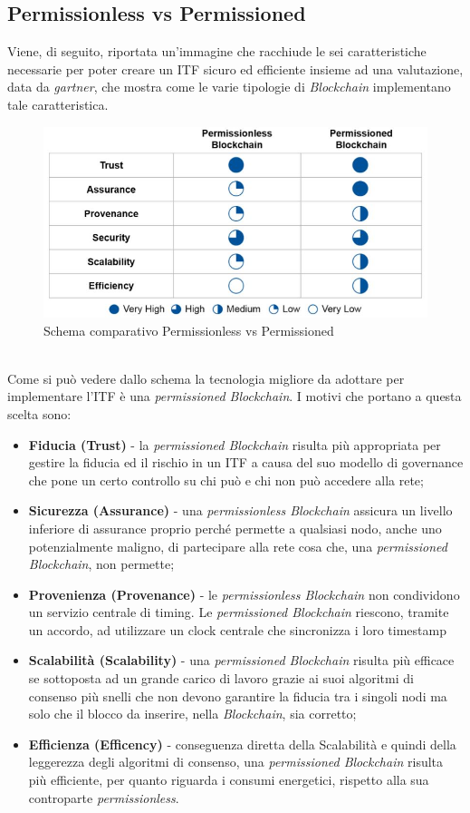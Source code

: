 \subsection{Permissionless vs Permissioned}
Viene, di seguito, riportata un'immagine che racchiude le sei caratteristiche necessarie per poter creare un \gls{ITF} sicuro ed efficiente insieme ad una valutazione, data da \emph{\gls{gartner}}\glsfirstoccur, che mostra come le varie tipologie di \textit{Blockchain} implementano tale caratteristica.
\begin{figure}[h]
	\centering
	\includegraphics[scale=0.50]{immagini/blockchain_ability_to_implement_ITF}
	\caption{Schema comparativo Permissionless vs Permissioned}
\end{figure} 
\\
Come si può vedere dallo schema la tecnologia migliore da adottare per implementare l'\gls{ITF} è una \textit{permissioned Blockchain}.
I motivi che portano a questa scelta sono:
\begin{itemize}
	\item \textbf{Fiducia (Trust)} - la \textit{permissioned Blockchain} risulta più appropriata per gestire la fiducia ed il rischio in un \gls{ITF} a causa del suo modello di governance che pone un certo controllo su chi può e chi non può accedere alla rete; 
	\item \textbf{Sicurezza (Assurance)} - una \textit{permissionless Blockchain} assicura un livello inferiore di assurance proprio perché permette a qualsiasi nodo, anche uno potenzialmente maligno, di partecipare alla rete cosa che, una \textit{permissioned Blockchain}, non permette;
	\item \textbf{Provenienza (Provenance)} - le \textit{permissionless Blockchain} non condividono un servizio centrale di timing. Le \textit{permissioned Blockchain} riescono, tramite un accordo, ad utilizzare un clock centrale che sincronizza i loro timestamp
	\item \textbf{Scalabilità (Scalability)} - una \textit{permissioned Blockchain} risulta più efficace se sottoposta ad un grande carico di lavoro grazie ai suoi algoritmi di consenso più snelli che non devono garantire la fiducia tra i singoli nodi ma solo che il blocco da inserire, nella \textit{Blockchain}, sia corretto;
	\item \textbf{Efficienza (Efficency)} - conseguenza diretta della Scalabilità e quindi della leggerezza degli algoritmi di consenso, una \textit{permissioned Blockchain} risulta più efficiente, per quanto riguarda i consumi energetici, rispetto alla sua controparte \textit{permissionless}.
\end{itemize}
